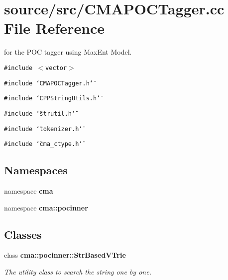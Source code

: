 \section{source/src/CMAPOCTagger.cc File Reference}
\label{CMAPOCTagger_8cc}
for the POC tagger using MaxEnt Model. 

{\tt \#include $<$vector$>$}\par
{\tt \#include \char`\"{}CMAPOCTagger.h\char`\"{}}\par
{\tt \#include \char`\"{}CPPStringUtils.h\char`\"{}}\par
{\tt \#include \char`\"{}strutil.h\char`\"{}}\par
{\tt \#include \char`\"{}tokenizer.h\char`\"{}}\par
{\tt \#include \char`\"{}cma\_\-ctype.h\char`\"{}}\par
\subsection*{Namespaces}
\begin{CompactItemize}
\item 
namespace \textbf{cma}
\item 
namespace \textbf{cma::pocinner}
\end{CompactItemize}
\subsection*{Classes}
\begin{CompactItemize}
\item 
class {\bf cma::pocinner::StrBasedVTrie}
\begin{CompactList}\small\item\em The utility class to search the string one by one. \item\end{CompactList}\end{CompactItemize}

